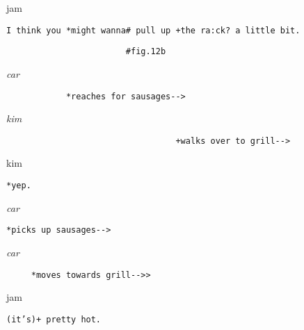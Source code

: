 \documentclass[output=paper,nonflat,modfont,draft]{langsci/langscibook}
\begin{document}
\begin{transbox}{4}{jam}
\begin{verbatim}
I think you *might wanna# pull up +the ra:ck? a little bit.
\end{verbatim}
\end{transbox}

\begin{transbox}{5}{\fig}
\begin{verbatim}
                        #fig.12b
\end{verbatim}
\end{transbox}

\begin{mdframedkendrick}[style=secondfoc]
\begin{transbox}{6}{\textit{car}}
\begin{verbatim}
            *reaches for sausages-->
\end{verbatim}
\end{transbox}
\end{mdframedkendrick}\vspace{-5mm}

\begin{transbox}{7}{\textit{kim}}
\begin{verbatim}
                                  +walks over to grill-->
\end{verbatim}
\end{transbox}


\begin{transbox}{9}{kim}
\begin{verbatim}
*yep.
\end{verbatim}
\end{transbox}

\begin{transbox}{10}{\textit{car}}
\begin{verbatim}
*picks up sausages-->
\end{verbatim}
\end{transbox}


\begin{transbox}{12}{\textit{car}}
\begin{verbatim}
     *moves towards grill-->>
\end{verbatim}
\end{transbox}

\begin{transbox}{13}{jam}
\begin{verbatim}
(it’s)+ pretty hot.
\end{verbatim}
\end{transbox}
\end{document}
